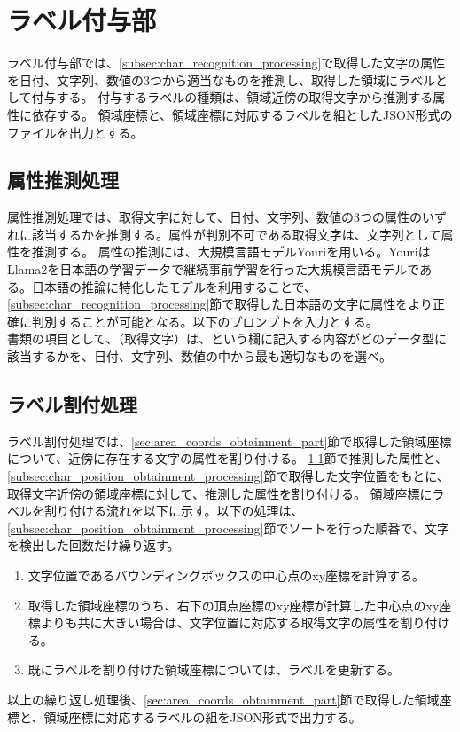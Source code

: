 \section{ラベル付与部}\label{sec:label_link_part}
ラベル付与部では、\ref{subsec:char_recognition_processing}で取得した文字の属性を日付、文字列、数値の3つから適当なものを推測し、取得した領域にラベルとして付与する。
付与するラベルの種類は、領域近傍の取得文字から推測する属性に依存する。
領域座標と、領域座標に対応するラベルを組としたJSON形式のファイルを出力とする。


\subsection{属性推測処理}\label{subsec:att_prediction_processing}
属性推測処理では、取得文字に対して、日付、文字列、数値の3つの属性のいずれに該当するかを推測する。属性が判別不可である取得文字は、文字列として属性を推測する。
属性の推測には、大規模言語モデルYouriを用いる。YouriはLlama2を日本語の学習データで継続事前学習を行った大規模言語モデルである。日本語の推論に特化したモデルを利用することで、\ref{subsec:char_recognition_processing}節で取得した日本語の文字に属性をより正確に判別することが可能となる。以下のプロンプトを入力とする。\\

書類の項目として、（取得文字）は、という欄に記入する内容がどのデータ型に該当するかを、日付、文字列、数値の中から最も適切なものを選べ。

\subsection{ラベル割付処理}\label{subsec:label_link_processing}
ラベル割付処理では、\ref{sec:area_coords_obtainment_part}節で取得した領域座標について、近傍に存在する文字の属性を割り付ける。
\ref{subsec:att_prediction_processing}節で推測した属性と、\ref{subsec:char_position_obtainment_processing}節で取得した文字位置をもとに、取得文字近傍の領域座標に対して、推測した属性を割り付ける。
領域座標にラベルを割り付ける流れを以下に示す。以下の処理は、\ref{subsec:char_position_obtainment_processing}節でソートを行った順番で、文字を検出した回数だけ繰り返す。

\begin{enumerate}
    \item 文字位置であるバウンディングボックスの中心点のxy座標を計算する。
    \item 取得した領域座標のうち、右下の頂点座標のxy座標が計算した中心点のxy座標よりも共に大きい場合は、文字位置に対応する取得文字の属性を割り付ける。
    \item 既にラベルを割り付けた領域座標については、ラベルを更新する。
\end{enumerate}

以上の繰り返し処理後、\ref{sec:area_coords_obtainment_part}節で取得した領域座標と、領域座標に対応するラベルの組をJSON形式で出力する。
